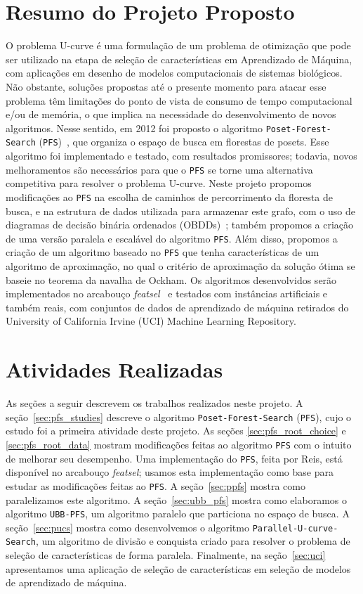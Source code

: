 \documentclass[12pt]{article}
\newcommand{\toolname}[1]{\textit{#1}}
\newcommand{\algname}[1]{\texttt{#1}}
\begin{document}
\section{Resumo do Projeto Proposto} \label{sec:resumo} %
O problema U-curve é uma formulação de um problema de otimização que 
pode ser utilizado na etapa de seleção de características em 
Aprendizado de Máquina, com aplicações em desenho de modelos 
computacionais de sistemas biológicos. Não obstante, soluções propostas 
até o presente momento para atacar esse problema têm limitações do 
ponto de vista de consumo de tempo computacional e/ou de memória, o que 
implica na necessidade do desenvolvimento de novos algoritmos. Nesse 
sentido, em 2012 foi proposto o algoritmo 
\algname{Poset\--Forest\--Search} (\algname{PFS})~\cite{msreis thesis}, 
que organiza o espaço de busca em florestas de posets. Esse algoritmo 
foi implementado e testado, com resultados promissores; todavia, novos 
melhoramentos são necessários para que o \algname{PFS} se torne uma 
alternativa competitiva para resolver o problema U-curve. Neste projeto 
propomos modificações ao \algname{PFS} na escolha de caminhos de 
percorrimento da floresta de busca, e na estrutura de dados utilizada 
para armazenar este grafo, com o uso de diagramas de decisão binária 
ordenados (OBDDs)~\cite{bryant}; também propomos a criação 
de uma versão paralela e escalável do algoritmo \algname{PFS}. Além 
disso, propomos a criação de um algoritmo baseado no \algname{PFS} que 
tenha características de um algoritmo de aproximação, no qual o critério 
de aproximação da solução ótima se baseie no teorema da navalha de 
Ockham. Os algoritmos desenvolvidos serão implementados no arcabouço 
\toolname{featsel}~\cite{featsel paper} e testados com instâncias 
artificiais e também reais, com conjuntos de dados de aprendizado de 
máquina retirados do University of California Irvine (UCI) Machine 
Learning Repository.

 
\section{Atividades Realizadas}
As seções a seguir descrevem os trabalhos realizados neste projeto. A
seção~\ref{sec:pfs_studies} descreve o algoritmo 
\algname{Poset\--Forest\--Search} (\algname{PFS}), cujo o estudo foi a
primeira atividade deste projeto. As seções \ref{sec:pfs_root_choice} e 
\ref{sec:pfs_root_data} mostram modificações feitas ao algoritmo
\algname{PFS} com o intuito de melhorar seu desempenho. Uma 
implementação do \algname{PFS}, feita por Reis, está disponível no
arcabouço \toolname{featsel}; usamos esta implementação como base para
estudar as modificações feitas ao \algname{PFS}. A seção~\ref{sec:ppfs}
mostra como paralelizamos este algoritmo. A seção~\ref{sec:ubb_pfs} 
mostra como elaboramos o algoritmo \algname{UBB-PFS}, um algoritmo 
paralelo que particiona no espaço de busca. A seção~\ref{sec:pucs} 
mostra como desenvolvemos o algoritmo 
\algname{Parallel\--U\--curve\--Search}, um algoritmo de divisão e 
conquista criado para resolver o problema de seleção de características 
de forma paralela. Finalmente, na seção~\ref{sec:uci} apresentamos uma
aplicação de seleção de características em seleção de modelos de 
aprendizado de máquina.
\end{document}
